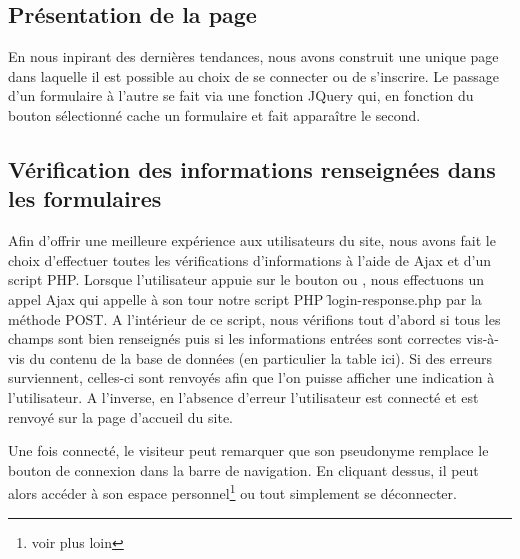         \bigskip
        \subsection*{Présentation de la page}

            En nous inpirant des dernières tendances, nous avons construit une unique page dans laquelle il est possible au choix de se connecter ou de s'inscrire. Le passage d'un formulaire à l'autre se fait via une fonction JQuery qui, en fonction du bouton sélectionné cache un formulaire et fait apparaître le second.


        \bigskip
        \subsection*{Vérification des informations renseignées dans les formulaires}

            Afin d'offrir une meilleure expérience aux utilisateurs du site, nous avons fait le choix d'effectuer toutes les vérifications d'informations à l'aide de Ajax et d'un script PHP. Lorsque l'utilisateur appuie sur le bouton  ou , nous effectuons un appel Ajax qui appelle à son tour notre script PHP \f{login-response.php} par la méthode POST. A l'intérieur de ce script, nous vérifions tout d'abord si tous les champs sont bien renseignés puis si les informations entrées sont correctes vis-à-vis du contenu de la base de données (en particulier la table  ici). Si des erreurs surviennent, celles-ci sont renvoyés afin que l'on puisse afficher une indication à l'utilisateur. A l'inverse, en l'absence d'erreur l'utilisateur est connecté et est renvoyé sur la page d'accueil du site. 


            \medskip
            Une fois connecté, le visiteur peut remarquer que son pseudonyme remplace le bouton de connexion dans la barre de navigation. En cliquant dessus, il peut alors accéder à son espace personnel\footnote{voir plus loin} ou tout simplement se déconnecter.


